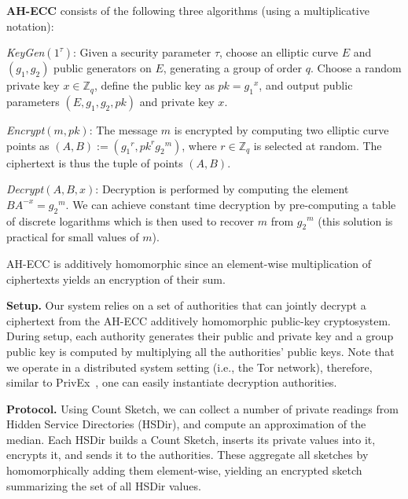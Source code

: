 \documentclass[conference]{IEEEtran}
\newcommand{\descr}[1]{\medskip \noindent \textbf{#1}}
\begin{document}
\descr{AH-ECC} consists of the following three algorithms (using a multiplicative notation):
\begin{compactenum}
\item {\em KeyGen}$(1^\tau)$: Given a security parameter $\tau$, choose an elliptic curve $E$ and $(g_1,g_2)$ public generators on $E$, generating a group of order $q$. Choose a random private key $x \in \mathbb{Z}_q$, define the public key as $pk = {g_1}^{x}$, and output public parameters $(E, g_1, g_2, \mathit{pk})$ and private key $x$. 
\item {\em Encrypt}$(m, \mathit{pk})$: The message $m$ is encrypted by computing two elliptic curve points as 
$(A, B) := ({g_1}^r, \mathit{pk}^r {g_2}^m)$, where $r \in \mathbb{Z}_q$ is selected at random. The ciphertext is thus the tuple of points $(A, B)$.
\item {\em Decrypt}$(A, B, x)$: Decryption is performed by computing the element $B A^{-x} = {g_2}^m$. We can achieve constant time decryption by pre-computing a table of discrete logarithms which is then used to recover $m$ from ${g_2}^m$ (this solution is practical  for small values of $m$).
\end{compactenum}
AH-ECC is additively homomorphic since an element-wise multiplication of ciphertexts yields an encryption of their sum.

\descr{Setup.} Our system relies on a set of authorities that can jointly decrypt a ciphertext from the AH-ECC additively homomorphic public-key cryptosystem.
During setup, each authority generates their public and private key and a group public key is computed by multiplying all the authorities' public keys. 
Note that we operate in a distributed system setting (i.e., the Tor network), therefore, similar to PrivEx~\cite{elahi2014privex}, one can easily instantiate decryption authorities.


\descr{Protocol.} Using Count Sketch, we can collect a number of private readings from Hidden Service Directories (HSDir), and compute an approximation of the median. 
Each HSDir builds a Count Sketch, inserts its private values into it, encrypts it, and sends it to the authorities. These aggregate all sketches by homomorphically adding them element-wise, yielding an encrypted sketch summarizing the set of all HSDir values. 
\end{document}
